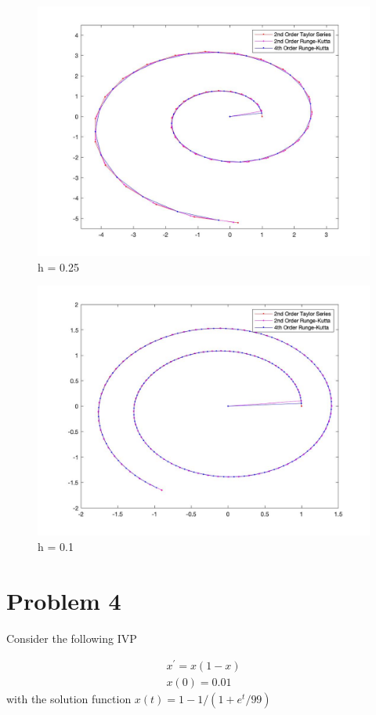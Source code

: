 \documentclass{article}
\begin{document}
\begin{figure}[H]
  \includegraphics[width=\linewidth]{docs/h25.jpg}
  \caption{h = 0.25}
\end{figure}

\begin{figure}[H]
  \includegraphics[width=\linewidth]{docs/0point1.jpg}
  \caption{h = 0.1}
\end{figure}


\section*{Problem 4}
Consider the following IVP

\begin{align*}
	x^{\prime} = x(1-x) \\
	x(0) = 0.01
\end{align*}
with the solution function $ x(t) = 1 - 1/(1 + e^{t}/99)$
\end{document}
